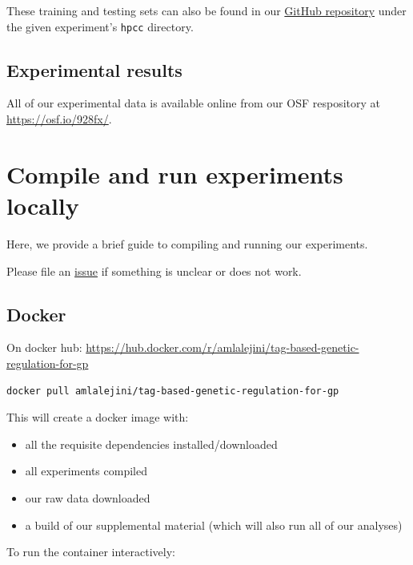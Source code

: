 \documentclass[]{book}
\providecommand{\tightlist}{%
  \setlength{\itemsep}{0pt}\setlength{\parskip}{0pt}}
\begin{document}
These training and testing sets can also be found in our \href{https://github.com/amlalejini/Tag-based-Genetic-Regulation-for-LinearGP}{GitHub repository} under the given experiment's \texttt{hpcc} directory.

\hypertarget{experimental-results}{%
\section{Experimental results}\label{experimental-results}}

All of our experimental data is available online from our OSF respository \citep{Lalejini_Moreno_Ofria_Data_2020} at \url{https://osf.io/928fx/}.

\hypertarget{compile-and-run-experiments-locally}{%
\chapter{Compile and run experiments locally}\label{compile-and-run-experiments-locally}}

Here, we provide a brief guide to compiling and running our experiments.

Please file an \href{https://github.com/amlalejini/Tag-based-Genetic-Regulation-for-LinearGP/issues}{issue} if something is unclear or does not work.

\hypertarget{docker}{%
\section{Docker}\label{docker}}

On docker hub: \url{https://hub.docker.com/r/amlalejini/tag-based-genetic-regulation-for-gp}

\begin{verbatim}
docker pull amlalejini/tag-based-genetic-regulation-for-gp
\end{verbatim}

This will create a docker image with:

\begin{itemize}
\tightlist
\item
  all the requisite dependencies installed/downloaded
\item
  all experiments compiled
\item
  our raw data downloaded
\item
  a build of our supplemental material (which will also run all of our analyses)
\end{itemize}

To run the container interactively:
\end{document}

